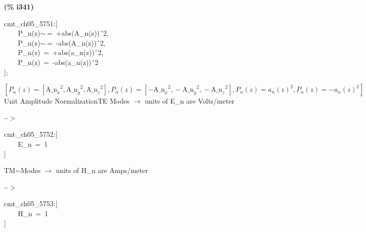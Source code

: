 \documentclass[fleqn]{article}
\begin{document}
\noindent
\begin{minipage}[t]{4.000000em}\color{red}\bfseries
(\% i341)	
\end{minipage}
\begin{minipage}[t]{\textwidth}\color{blue}
cmt\_ch05\_5751:[\\
\ \ \ \ P\_n(z)\ensuremath{\sim\ }=\ +abs(A\_n(z))\^\ 2,\ \\
\ \ \ \ P\_n(z)\ensuremath{\sim\ }=\ -abs(A\_n(z))\^\ 2,\ \\
\ \ \ \ P\_n(z)\ =\ +abs(a\_n(z))\^\ 2,\\
\ \ \ \ P\_n(z)\ =\ -abs(a\_n(z))\^\ 2\\
];
\end{minipage}
\[\displaystyle \tag{\% o341} 
\operatorname{[}{P_n}(z)=\left[ {{{{\ensuremath{\mathrm{A\_ n}}}_x}}^{2}}\operatorname{,}{{{{\ensuremath{\mathrm{A\_ n}}}_y}}^{2}}\operatorname{,}{{{{\ensuremath{\mathrm{A\_ n}}}_z}}^{2}}\right] \operatorname{,}{P_n}(z)=\left[ -{{{{\ensuremath{\mathrm{A\_ n}}}_x}}^{2}}\operatorname{,}-{{{{\ensuremath{\mathrm{A\_ n}}}_y}}^{2}}\operatorname{,}-{{{{\ensuremath{\mathrm{A\_ n}}}_z}}^{2}}\right] \operatorname{,}{P_n}(z)={{{a_n}(z)}^{2}}\operatorname{,
}{P_n}(z)=-{{{a_n}(z)}^{2}}\operatorname{]}\mbox{}
\]
Unit Amplitude NormalizationTE Modes \ensuremath{\longrightarrow} units of E\_n are Volts/meter


\noindent
\begin{minipage}[t]{4.000000em}\color{red}\bfseries
 --\ensuremath{\ensuremath{>}}	
\end{minipage}
\begin{minipage}[t]{\textwidth}\color{blue}
cmt\_ch05\_5752:[\\
\ \ \ \ E\_n\ =\ 1\\
]
\end{minipage}

\noindent%

TM\ensuremath{\sim }Modes \ensuremath{\longrightarrow} units of H\_n are Amps/meter


\noindent
\begin{minipage}[t]{4.000000em}\color{red}\bfseries
 --\ensuremath{\ensuremath{>}}	
\end{minipage}
\begin{minipage}[t]{\textwidth}\color{blue}
cmt\_ch05\_5753:[\\
\ \ \ \ H\_n\ =\ 1\\
]
\end{minipage}
\end{document}
